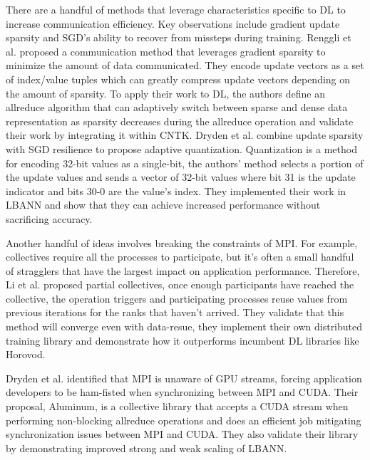 There are a handful of methods that leverage characteristics specific to DL to increase communication efficiency.
Key observations include gradient update sparsity and SGD's ability to recover from missteps during training.
Renggli et al. \cite{Renggli2019SparCML} proposed a communication method that leverages gradient sparsity to minimize the amount of data communicated.
They encode update vectors as a set of index/value tuples which can greatly compress update vectors depending on the amount of sparsity.
To apply their work to DL, the authors define an allreduce algorithm that can adaptively switch between sparse and dense data representation as sparsity decreases during the allreduce operation and validate their work by integrating it within CNTK.
Dryden et al. \cite{Dryden2016CommQuantDPDNN} combine update sparsity with SGD resilience to propose adaptive quantization. 
Quantization is a method for encoding 32-bit values as a single-bit, the authors' method selects a portion of the update values and sends a vector of 32-bit values where bit 31 is the update indicator and bits 30-0 are the value's index.
They implemented their work in LBANN and show that they can achieve increased performance without sacrificing accuracy.

Another handful of ideas involves breaking the constraints of MPI.
For example, collectives require all the processes to participate, but it's often a small handful of stragglers that have the largest impact on application performance. 
Therefore, Li et al. \cite{Li2020DLPartialColl} proposed partial collectives, once enough participants have reached the collective, the operation triggers and participating processes reuse values from previous iterations for the ranks that haven't arrived.
They validate that this method will converge even with data-resue, they implement their own distributed training library and demonstrate how it outperforms incumbent DL libraries like Horovod.

Dryden et al. \cite{Dryden2018Aluminum} identified that MPI is unaware of GPU streams, forcing application developers to be ham-fisted when synchronizing between MPI and CUDA.
Their proposal, Aluminum, is a collective library that accepts a CUDA stream when performing non-blocking allreduce operations and does an efficient job mitigating synchronization issues between MPI and CUDA.
They also validate their library by demonstrating improved strong and weak scaling of LBANN.

